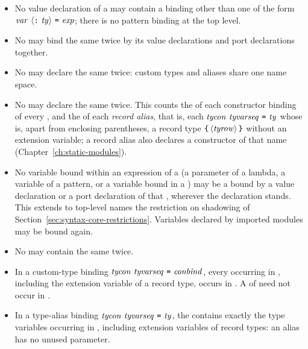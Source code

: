 \begin{itemize}
\item{} No value declaration of a \topdec{} may contain a binding other than
  one of the form $\var\ \opt{\kw{:}\ \ty}\ \kw{=}\ \expm$; there is no
  pattern binding at the top level.

\item{} No \topdec{} may bind the same \var{} twice by its value declarations
  and port declarations together.

\item{} No \topdec{} may declare the same \tycon{} twice: custom types and
  aliases share one name space.

\item{} No \topdec{} may declare the same \con{} twice. This counts the \con{}
  of each constructor binding of every \datbind, and the \tycon{} of each
  \emph{record alias}, that is, each \typbind{} $\mathit{tycon}\ \mathit{tyvarseq}\ \textnormal{\texttt{=}}\
  \mathit{ty}$ whose \ty{} is, apart from enclosing parentheses, a record type
  $\kw{\kwlb}\,\opt{\tyrow}\,\kw{\kwrb}$ without an extension variable; a
  record alias also declares a constructor of that name
  (Chapter~\ref{ch:static-modules}).

\item{} No variable bound within an expression of a \topdec{} (a parameter of
  a lambda, a variable of a pattern, or a variable bound in a \kw{let}) may be
  a \var{} bound by a value declaration or a port declaration of that
  \topdec, wherever the declaration stands. This extends to top-level names
  the restriction on shadowing of
  Section~\ref{sec:syntax-core-restrictions}. Variables declared by imported
  modules may be bound again.

\item{} No \tyvarseq{} may contain the same \tyvar{} twice.

\item{} In a custom-type binding $\tycon\ \tyvarseq\ \kw{=}\ \conbind$, every
  \tyvar{} occurring in \conbind{}, including the extension variable of a
  record type, occurs in \tyvarseq. A \tyvar{} of \tyvarseq{} need not occur
  in \conbind.

\item{} In a type-alias binding $\tycon\ \tyvarseq\ \kw{=}\ \ty$, the
  \tyvarseq{} contains exactly the type variables occurring in \ty,
  including extension variables of record types: an alias has no unused
  parameter.


\end{itemize}
